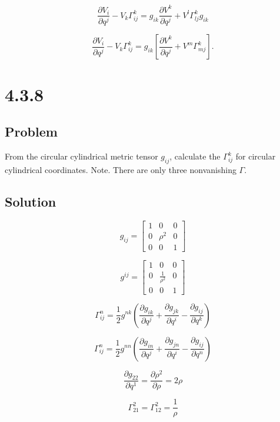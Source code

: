 \documentclass[12pt]{article}
\begin{document}
\[
    \frac{\partial V_i}{\partial q^j} - V_k \Gamma_{i j}^k
    = g_{ik} \frac{\partial V^k}{\partial q^j}
    + V^l \Gamma_{l j}^k g_{ik}
\]

\[
    \frac{\partial V_i}{\partial q^j}-V_k \Gamma_{i j}^k=g_{i k}\left[\frac{\partial V^k}{\partial q^j}+V^m \Gamma_{m j}^k\right] .
\]

\newpage
\section{4.3.8}

\subsection{Problem}

From the circular cylindrical metric tensor \(g_{i j}\), calculate the \(\Gamma_{i j}^k\) for circular cylindrical coordinates.
Note. There are only three nonvanishing \(\Gamma\).

\subsection{Solution}

\[
    g_{ij} = \left[\begin{array}{ccc}
            1 & 0      & 0 \\
            0 & \rho^2 & 0 \\
            0 & 0      & 1
        \end{array}\right]
\]

\[
    g^{ij} = \left[\begin{array}{ccc}
            1 & 0                & 0 \\
            0 & \frac{1}{\rho^2} & 0 \\
            0 & 0                & 1
        \end{array}\right]
\]

\[
    \Gamma_{i j}^n = \frac{1}{2} g^{n k} \left(\frac{\partial g_{i k}}{\partial q^j} + \frac{\partial g_{j k}}{\partial q^i} - \frac{\partial g_{i j}}{\partial q^k}\right)
\]

\[
    \Gamma_{i j}^n = \frac{1}{2} g^{n n} \left(\frac{\partial g_{i n}}{\partial q^j} + \frac{\partial g_{j n}}{\partial q^i} - \frac{\partial g_{i j}}{\partial q^n}\right)
\]

\[
    \frac{\partial g_{2 2}}{\partial q^1} = \frac{\partial \rho^2}{\partial \rho} = 2\rho
\]

\[
    \Gamma_{2 1}^2 = \Gamma_{1 2}^2 = \frac{1}{\rho}
\]
\end{document}
